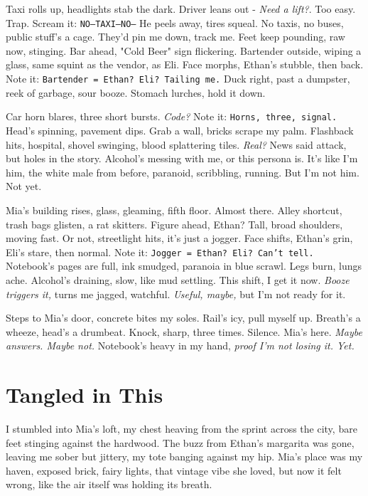 \documentclass[12pt,oneside]{book} %
\newcommand{\note}[1]{\texttt{#1}}
\begin{document}
Taxi rolls up, headlights stab the dark. Driver leans out - \textit{Need a lift?}. Too easy. Trap. Scream it: \note{NO—TAXI—NO—} He peels away, tires squeal. No taxis, no buses, public stuff’s a cage. They’d pin me down, track me. Feet keep pounding, raw now, stinging. Bar ahead, "Cold Beer" sign flickering. Bartender outside, wiping a glass, same squint as the vendor, as \textnormal{Eli}. Face morphs, Ethan’s stubble, then back. Note it: \note{Bartender = Ethan? Eli? Tailing me.} Duck right, past a dumpster, reek of garbage, sour booze. Stomach lurches, hold it down.

Car horn blares, three short bursts. \textit{Code?} Note it: \note{Horns, three, signal.} Head’s spinning, pavement dips. Grab a wall, bricks scrape my palm. Flashback hits, hospital, shovel swinging, blood splattering tiles. \textit{Real?} News said attack, but holes in the story. Alcohol’s messing with me, or this persona is. It’s like I’m him, the white male from before, paranoid, scribbling, running. But I’m not him. Not yet.

Mia’s building rises, glass, gleaming, fifth floor. Almost there. Alley shortcut, trash bags glisten, a rat skitters. Figure ahead, Ethan? Tall, broad shoulders, moving fast. Or not, streetlight hits, it’s just a jogger. Face shifts, Ethan’s grin, \textnormal{Eli}’s stare, then normal. Note it: \note{Jogger = Ethan? Eli? Can’t tell.} Notebook’s pages are full, ink smudged, paranoia in blue scrawl. Legs burn, lungs ache. Alcohol’s draining, slow, like mud settling. This shift, I get it now. \textit{Booze triggers it,} turns me jagged, watchful. \textit{Useful, maybe,} but I’m not ready for it.

Steps to Mia’s door, concrete bites my soles. Rail’s icy, pull myself up. Breath’s a wheeze, head’s a drumbeat. Knock, sharp, three times. Silence. Mia’s here. \textit{Maybe answers. Maybe not.} Notebook’s heavy in my hand, \textit{proof I’m not losing it. Yet.}

\chapter{Tangled in This}

I stumbled into Mia’s loft, my chest heaving from the sprint across the city, bare feet stinging against the hardwood. The buzz from Ethan’s margarita was gone, leaving me sober but jittery, my tote banging against my hip. Mia’s place was my haven, exposed brick, fairy lights, that vintage vibe she loved, but now it felt wrong, like the air itself was holding its breath.
\end{document}
